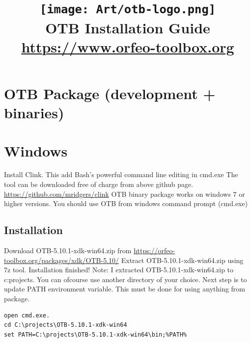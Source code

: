 \documentclass[10pt,a4paper]{article}
\title{\texttt{[image: Art/otb-logo.png]}\\
  OTB Installation Guide\\
  {\small\url{https://www.orfeo-toolbox.org}}
}
\begin{document}
\maketitle

\tableofcontents

\clearpage

\clearpage
\section{OTB Package (development + binaries)}



\section{Windows}

Install Clink.
This add Bash's powerful command line editing in cmd.exe
\newline
The tool can be downloaded free of charge from above github page. \url{https://github.com/mridgers/clink}
\newline
\newline
OTB binary package works on windows 7 or higher versions.
You should use OTB from windows command prompt (cmd.exe)

\subsection{Installation}

Download OTB-5.10.1-xdk-win64.zip from \url{https://orfeo-toolbox.org/packages/xdk/OTB-5.10/}
\newline
Extract OTB-5.10.1-xdk-win64.zip using 7z tool.
\newline
Installation finished!
\newline \newline
Note: I extracted OTB-5.10.1-xdk-win64.zip to c:projects.
\newline
You can ofcourse use another directory of your choice.
\newline \newline
Next step is to update PATH environment variable. This must be done for using anything from package.

\begin{verbatim}
open cmd.exe.
cd C:\projects\OTB-5.10.1-xdk-win64
set PATH=C:\projects\OTB-5.10.1-xdk-win64\bin;%PATH%
\end{verbatim}
\end{document}

